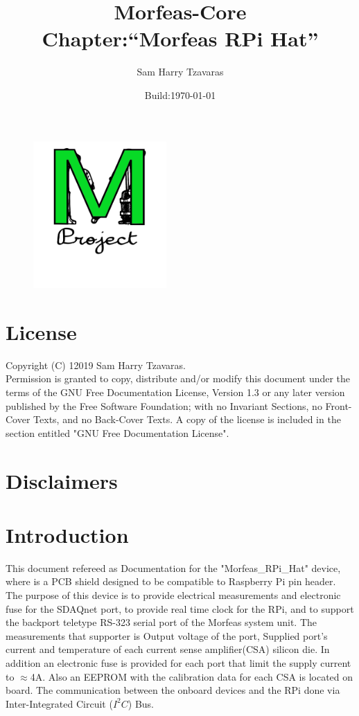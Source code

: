 \documentclass{article}
\title{Morfeas-Core\\Chapter:``Morfeas RPi Hat''}
\date{Build:\today}
\author{Sam Harry Tzavaras}
\begin{document}
\clearpage
\begin{figure}
\centering
  \includegraphics[width=2in]{../../../Docs/Morfeas_project_Documentation/ArtWork/Morfeas_logo_green.png}
\end{figure}
\maketitle
\thispagestyle{empty}
\newpage
\section{License}
Copyright (C)  12019  Sam Harry Tzavaras.\\
Permission is granted to copy, distribute and/or modify this document
under the terms of the GNU Free Documentation License, Version 1.3
or any later version published by the Free Software Foundation;
with no Invariant Sections, no Front-Cover Texts, and no Back-Cover Texts.
A copy of the license is included in the section entitled "GNU Free Documentation License".
\section{Disclaimers}
\newpage
\newpage
\tableofcontents
\newpage
\section{Introduction}
This document refereed as Documentation for the "Morfeas\_RPi\_Hat" device, where is a PCB shield designed to be compatible to Raspberry Pi pin header.
The purpose of this device is to provide electrical measurements and electronic fuse for the SDAQnet port, to provide real time clock for the RPi,
and to support the backport teletype RS-323 serial port of the Morfeas system unit. The measurements that supporter is Output voltage of the port,
Supplied port's current and temperature of each current sense amplifier(CSA) silicon die.
In addition an electronic fuse is provided for each port that limit the supply current to $\approx$4A.
Also an EEPROM with the calibration data for each CSA is located on board. The communication between the onboard devices and the RPi done
via Inter-Integrated Circuit ($I^2C$) Bus.
\end{document}
